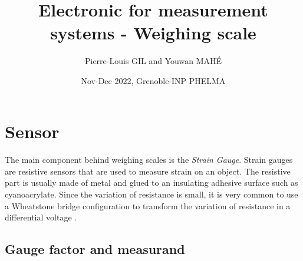 \documentclass{article}[12pt]
\title{Electronic for measurement systems - Weighing scale}
\author{Pierre-Louis GIL and Youwan MAHÉ}
\date{Nov-Dec 2022, Grenoble-INP PHELMA}
\begin{document}
\maketitle
\tableofcontents
\newpage

\section{Sensor}
\paragraph{}
The main component behind weighing scales is the \emph{Strain Gauge}. Strain gauges are resistive sensors that are used to measure strain on an object. The resistive part is usually made of metal and glued to an insulating adhesive surface such as cyanoacrylate. Since the variation of resistance is  small, it is very common to use a Wheatstone bridge configuration to transform the variation of resistance in a differential voltage \cite{LeBerre-2016}.
\subsection{Gauge factor and measurand}
\end{document}

